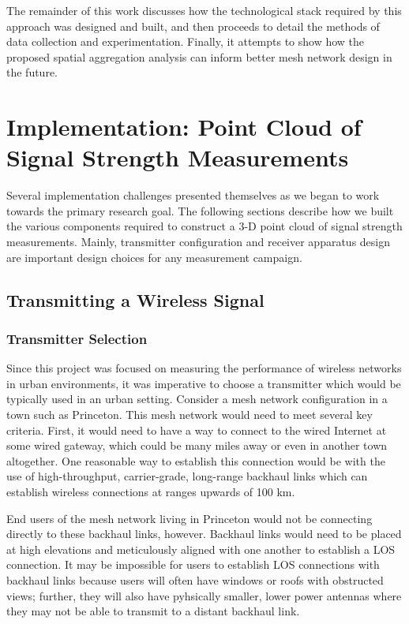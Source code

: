 \documentclass[pageno]{jpaper}
\begin{document}
The remainder of this work discusses how the technological stack required by this approach was designed and built, and then proceeds to detail the methods of data collection and experimentation. Finally, it attempts to show how the proposed spatial aggregation analysis can inform better mesh network design in the future.

\section{Implementation: Point Cloud of Signal Strength Measurements}
Several implementation challenges presented themselves as we began to work towards the primary research goal. The following sections describe how we built the various components required to construct a 3-D point cloud of signal strength measurements. Mainly, transmitter configuration and receiver apparatus design are  important design choices for any measurement campaign.

\subsection{Transmitting a Wireless Signal}

\subsubsection{Transmitter Selection}
Since this project was focused on measuring the performance of wireless networks in urban environments, it was imperative to choose a transmitter which would be typically used in an urban setting. Consider a mesh network configuration in a town such as Princeton. This mesh network would need to meet several key criteria. First, it would need to have a way to connect to the wired Internet at some wired gateway, which could be many miles away or even in another town altogether. One reasonable way to establish this connection would be with the use of high-throughput, carrier-grade, long-range backhaul links which can establish wireless connections at ranges upwards of 100 km\cite{airfiber}.

End users of the mesh network living in Princeton would not be connecting directly to these backhaul links, however. Backhaul links would need to be placed at high elevations and meticulously aligned with one another to establish a LOS connection. It may be impossible for users to establish LOS connections with backhaul links because users will often have windows or roofs with obstructed views; further, they will also have pyhsically smaller, lower power antennas where they may not be able to transmit to a distant backhaul link.
\end{document}
